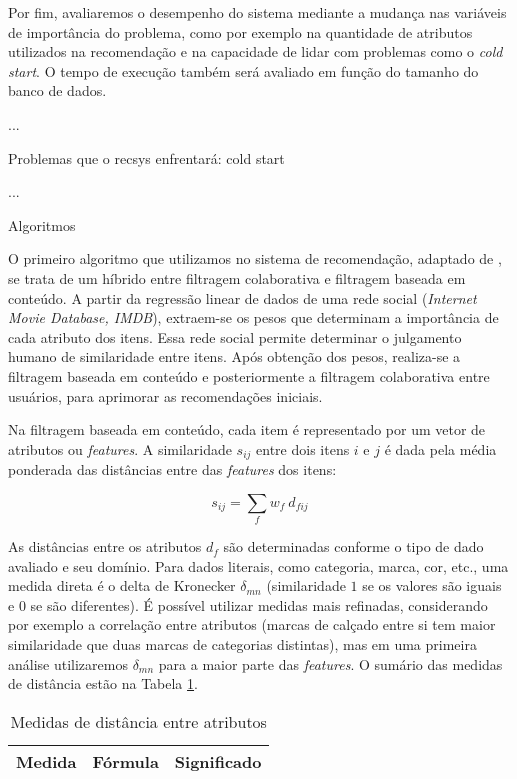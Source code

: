 Por fim, avaliaremos o desempenho do sistema mediante a mudança nas variáveis de importância do problema, como por exemplo na quantidade de atributos utilizados na recomendação e na capacidade de lidar com problemas como o \textit{cold start}. O tempo de execução também será avaliado em função do tamanho do banco de dados.

...

Problemas que o recsys enfrentará: cold start

...

Algoritmos

O primeiro algoritmo que utilizamos no sistema de recomendação, adaptado de  \cite{symeonidis2007feature}, se trata de um híbrido entre filtragem colaborativa e filtragem baseada em conteúdo. A partir da regressão linear de dados de uma rede social (\textit{Internet Movie Database, IMDB}), extraem-se os pesos que determinam a importância de cada atributo dos itens. Essa rede social permite determinar o julgamento humano de similaridade entre itens. Após obtenção dos pesos, realiza-se a filtragem baseada em conteúdo e posteriormente a filtragem colaborativa entre usuários, para aprimorar as recomendações iniciais.

Na filtragem baseada em conteúdo, cada item é representado por um vetor de atributos ou \textit{features}. A similaridade $s_{ij}$ entre dois itens $i$ e $j$ é dada pela média ponderada das distâncias entre das \textit{features} dos itens:

\begin{equation} 
    s_{ij} = \sum_{f}{w_{f} ~ d_{fij}}
\end{equation}

As distâncias entre os atributos $d_f$ são determinadas conforme o tipo de dado avaliado e seu domínio. Para dados literais, como categoria, marca, cor, etc., uma medida direta é o delta de Kronecker $\delta_{mn}$ (similaridade $1$ se os valores são iguais e $0$ se são diferentes). É possível utilizar medidas mais refinadas, considerando por exemplo a correlação entre atributos (marcas de calçado entre si tem maior similaridade que duas marcas de categorias distintas), mas em uma primeira análise utilizaremos $\delta_{mn}$ para a maior parte das \textit{features}. O sumário das medidas de distância estão na Tabela \ref{tab:medidas-distancia}.

\begin{table}[H]
\begin{center}
    \caption{Medidas de distância entre atributos}
    \label{tab:medidas-distancia}
    \begin{tabular}{ | l | c | p{5cm} | }
    \hline
    \textbf{Medida} & \textbf{Fórmula} & \textbf{Significado} \\ \hline
    \end{tabular}
\end{center}
\end{table}
 
